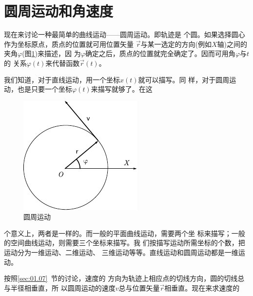 \section{圆周运动和角速度}\label{sec:01.09}

    现在来讨论一种最简单的曲线运动——圆周运动。即轨迹是
个圆。如果选择圆心作为坐标原点，质点的位置就可用位置矢量
$\vec{r}$与某一选定的方向(例如$X$轴)之间的夹角$\varphi$(图\ref{fig:01.17})来描述，因
为$\varphi$确定之后，质点的位置就完全确定了。因而可用角$\varphi$与$t$的
关系$\varphi(t)$来代替函数$\vec{r}(t)$。

    我们知道，对于直线运动，用一个坐标$x(t)$就可以描写。同
\clearpage
\noindent 样，对于圆周运动，也是只要一个坐标$\varphi(t)$来描写就够了。在这
\begin{figure}
    \centering \small
    \includegraphics{figure/fig01.17}
    \caption{圆周运动}
    \label{fig:01.17}
\end{figure}
个意义上，两者是一样的。而一般的平面曲线运动，需要两个坐
标来描写；一般的空间曲线运动，则需要三个坐标来描写。我
们按描写运动所需坐标的个数，把运动分为一维运动、二维运动、
三维运动等等。直线运动和圆周运动都是一维运动。

按照\ref{sec:01.07}~节的讨论，速度的
方向为轨迹上相应点的切线方向，圆的切线总与半径相垂直，所
以圆周运动的速度$v$总与位置矢量$\vec{r}$相垂直。现在来求速度的

